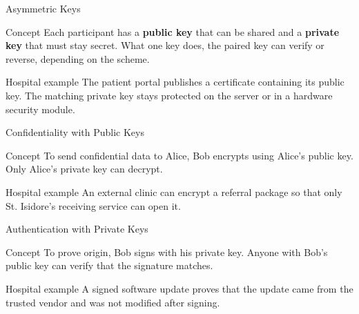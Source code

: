 \documentclass[presentation]{beamer}
\begin{document}
\begin{frame}[c]{Asymmetric Keys}
\begin{block}{Concept}
Each participant has a \textbf{public key} that can be shared and a \textbf{private key} that must stay
secret. What one key does, the paired key can verify or reverse, depending on the scheme.
\end{block}

\begin{exampleblock}{Hospital example}
The patient portal publishes a certificate containing its public key. The matching private key
stays protected on the server or in a hardware security module.
\end{exampleblock}
\end{frame}

\begin{frame}[c]{Confidentiality with Public Keys}
\begin{block}{Concept}
To send confidential data to Alice, Bob encrypts using Alice's public key. Only Alice's private key
can decrypt.
\end{block}

\begin{exampleblock}{Hospital example}
An external clinic can encrypt a referral package so that only St. Isidore's receiving service can
open it.
\end{exampleblock}
\end{frame}

\begin{frame}[c]{Authentication with Private Keys}
\begin{block}{Concept}
To prove origin, Bob signs with his private key. Anyone with Bob's public key can verify that the
signature matches.
\end{block}

\begin{exampleblock}{Hospital example}
A signed software update proves that the update came from the trusted vendor and was not modified
after signing.
\end{exampleblock}
\end{frame}
\end{document}
